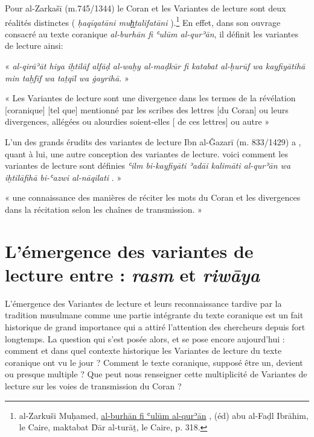 \documentclass[a4paper,12pt]{report}
\begin{document}
\begin{itemize}
 Pour al-Zarkašī (m.745/1344)  le Coran et les Variantes de lecture sont deux réalités distinctes ( \textit{ḥaqīqatāni muḫ̬talifatāni} ).\footnote{al-Zarkuši Muḥamed,  \underline {al-burhān fi ʿulūm al-qurʾān} , (éd)  abu al-Faḍl Ibrāhim, le Caire, maktabat D̄ār al-turāṯ, le Caire,  p. 318. } En effet, dans son ouvrage consacré  au texte coranique \textit{al-burhān fi ʿulūm al-qurʾān}, il définit  les variantes de lecture ainsi: 

« \textit{al-qirāʾāt hiya iḫtilāf alfāḍ al-waḫy al-maḍkūr fi katabat al-ḥurūf wa kayfiyātihā min taḫfīf wa taṯqīl wa ġayrihā.} »

« Les Variantes de lecture sont une divergence dans les termes de la révélation [coranique] [tel que] mentionné par les scribes des lettres [du Coran] ou leurs divergences, allégées ou alourdies  soient-elles  [ de ces lettres] ou autre »


L’un des grands  érudits des variantes de lecture Ibn al-Ǧazar\=i  (m. 833/1429) a , quant à lui, une autre conception des variantes de lecture. voici comment les variantes de lecture sont définies
\textit{ʿilm bi-kayfiyāti ʾadāi kalimāti al-qurʾān wa iḫtilāfih\=a bi-ʿazwi al-nāqilati }. » 

 « une connaissance des  manières de réciter  les mots du Coran et les   divergences dans la récitation  selon les chaînes de transmission. »

















\section{	L’émergence des variantes de lecture entre :\textit{ rasm } et \textit{riwāya}}


L’émergence des Variantes de lecture et leurs reconnaissance tardive par la tradition musulmane comme  une partie intégrante du texte coranique est un fait historique de grand importance qui a attiré l’attention des chercheurs depuis fort longtemps. La question qui s’est posée alors, et se pose  encore aujourd’hui : comment et dans quel contexte historique  les Variantes de lecture du texte coranique ont vu le jour ?  Comment le texte coranique, supposé être un, devient ou presque multiple ?  Que peut nous renseigner cette multiplicité de Variantes de lecture sur les voies de transmission du Coran ? 


\end{itemize}
\end{document}
